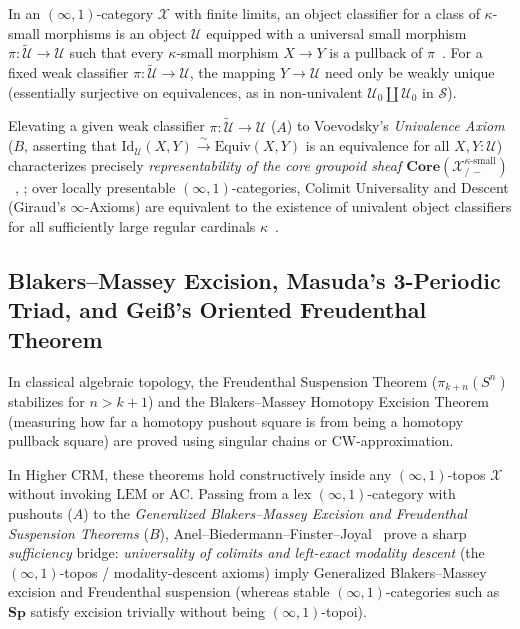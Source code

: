 \documentclass[10pt,twoside,openright]{book}
\theoremstyle{crmplain}
\theoremstyle{crmdef}
\theoremstyle{crmremark}
\begin{document}
In an $(\infty, 1)$-category $\mathcal{X}$ with finite limits, an object classifier for a class of $\kappa$-small morphisms is an object $\mathcal{U}$ equipped with a universal small morphism $\pi : \widetilde{\mathcal{U}} \to \mathcal{U}$ such that every $\kappa$-small morphism $X \to Y$ is a pullback of $\pi$~\cite[\S 6.1.6]{Lurie09}. For a fixed weak classifier $\pi : \widetilde{\mathcal{U}} \to \mathcal{U}$, the mapping $Y \to \mathcal{U}$ need only be weakly unique (essentially surjective on equivalences, as in non-univalent $\mathcal{U}_0 \amalg \mathcal{U}_0$ in $\mathcal{S}$).

Elevating a given weak classifier $\pi : \widetilde{\mathcal{U}} \to \mathcal{U}$ ($A$) to Voevodsky's \emph{Univalence Axiom}~\cite[\S 2.10]{HoTT13} ($B$, asserting that $\mathrm{Id}_{\mathcal{U}}(X, Y) \xrightarrow{\sim} \mathrm{Equiv}(X, Y)$ is an equivalence for all $X, Y: \mathcal{U}$) characterizes precisely \emph{representability of the core groupoid sheaf $\mathbf{Core}(\mathcal{X}_{/\,-}^{\kappa\text{-small}})$}~\cite[\S 6.1.6]{Lurie09}, \cite{GepnerKock17}; over locally presentable $(\infty, 1)$-categories, Colimit Universality and Descent (Giraud's $\infty$-Axioms) are equivalent to the existence of univalent object classifiers for all sufficiently large regular cardinals $\kappa$~\cite[\S\S 6.1.3, 6.1.6, Thm.~6.1.6.8]{Lurie09}.

\subsection{\texorpdfstring{Blakers--Massey Excision, Masuda's 3-Periodic Triad, and Gei\ss's Oriented Freudenthal Theorem}{Blakers-Massey Excision, Masuda's 3-Periodic Triad, and Geiss's Oriented Freudenthal Theorem}}

In classical algebraic topology, the Freudenthal Suspension Theorem ($\pi_{k+n}(S^n)$ stabilizes for $n > k+1$) and the Blakers--Massey Homotopy Excision Theorem (measuring how far a homotopy pushout square is from being a homotopy pullback square) are proved using singular chains or CW-approximation.

In Higher $\mathrm{CRM}$, these theorems hold constructively inside any $(\infty, 1)$-topos $\mathcal{X}$ without invoking $\mathrm{LEM}$ or $\mathrm{AC}$. Passing from a lex $(\infty, 1)$-category with pushouts ($A$) to the \emph{Generalized Blakers--Massey Excision and Freudenthal Suspension Theorems} ($B$), Anel--Biedermann--Finster--Joyal~\cite[\S\S 3--4, Thm.~4.1.1]{ABFJ20} prove a sharp \emph{sufficiency} bridge: \emph{universality of colimits and left-exact modality descent} (the $(\infty, 1)$-topos / modality-descent axioms) imply Generalized Blakers--Massey excision and Freudenthal suspension (whereas stable $(\infty, 1)$-categories such as $\mathbf{Sp}$ satisfy excision trivially without being $(\infty, 1)$-topoi).
\end{document}
